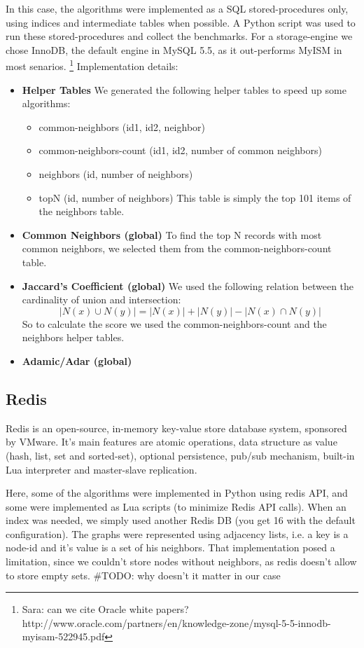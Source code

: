 In this case, the algorithms were implemented as a SQL stored-procedures only,
using indices and intermediate tables when possible. A Python script was used
to run these stored-procedures and collect the benchmarks. For a storage-engine 
we chose InnoDB, the default engine in MySQL 5.5, as it out-performs MyISM in 
most senarios. \footnote{Sara: can we cite Oracle white papers? 
http://www.oracle.com/partners/en/knowledge-zone/mysql-5-5-innodb-myisam-522945.pdf}
\linebreak
Implementation details:
\begin{itemize}
	\item {\bf Helper Tables} We generated the following helper tables 
		to speed up some algorithms:
		\begin{itemize}
			\item {common-neighbors (id1, id2, neighbor)}
			\item {common-neighbors-count (id1, id2, number of common neighbors)}
			\item {neighbors (id, number of neighbors)}
			\item {topN (id, number of neighbors)}
				This table is simply the top 101 items of the neighbors table.
		\end{itemize}
	\item {\bf Common Neighbors (global)} 
		To find the top N records with most common neighbors, 
		we selected them from the common-neighbors-count table.
	\item {\bf Jaccard's Coefficient (global)} 
		We used the following relation between the cardinality of union and intersection:
		\[{|N(x) \cup N(y)|} = {|N(x)| + |N(y)| - |N(x) \cap N(y)|}\]
		So to calculate the score we used the common-neighbors-count and the neighbors helper tables.
	\item {\bf Adamic/Adar (global)} 
\end{itemize}

\subsection{Redis}
Redis is an open-source, in-memory key-value store database system, sponsored
by VMware. It's main features are atomic operations, data structure as value
(hash, list, set and sorted-set), optional persistence, pub/sub mechanism,
built-in Lua interpreter and master-slave replication. 

Here, some of the algorithms were implemented in Python using redis API, and
some were implemented as Lua scripts (to minimize Redis API calls). When an
index was needed, we simply used another Redis DB (you get 16 with the default
configuration). 
The graphs were represented using adjacency lists, i.e. a key is a node-id and
it's value is a set of his neighbors. That implementation posed a limitation,
since we couldn't store nodes without neighbors, as redis doesn't allow to
store empty sets. \#TODO: why doesn't it matter in our case 

